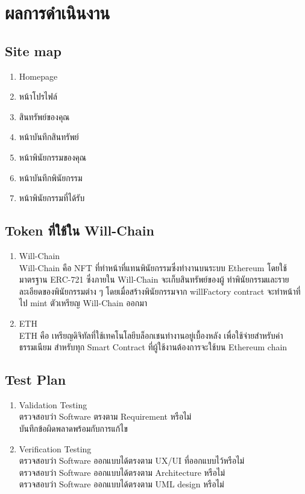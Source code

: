 \documentclass[12pt,oneside,openright,a4paper]{cpe-thai-project}
\begin{document}
\chapter{ผลการดําเนินงาน}
\section{Site map}
\begin{enumerate}[label=\thesection.\arabic*,leftmargin=0pt,itemindent=1.25cm]
	\item Homepage 
	\item หน้าโปรไฟล์ 
	\item สินทรัพย์ของคุณ 
	\item หน้าบันทึกสินทรัพย์
	\item หน้าพินัยกรรมของคุณ 
	\item หน้าบันทึกพินัยกรรม 
	\item หน้าพินัยกรรมที่ได้รับ 
\end{enumerate}
\section{Token ที่ใช้ใน Will-Chain}
\begin{enumerate}[label=\thesection.\arabic*,leftmargin=0pt,itemindent=1.25cm]
	\item Will-Chain \\
			\tab \tab Will-Chain คือ NFT ที่ทำหน้าที่แทนพินัยกรรมซึ่งทำงานบนระบบ Ethereum โดยใช้มาตรฐาน ERC-721 ซึ่งภายใน Will-Chain จะเก็บสินทรัพย์ของผู้
ทำพินัยกรรมและรายละเอียดของพินัยกรรมต่าง ๆ โดยเมื่อสร้างพินัยกรรมจาก willFactory contract จะทำหน้าที่ไป mint ตัวเหรียญ Will-Chain ออกมา
	\item ETH \\
			\tab \tab ETH คือ เหรียญดิจิทัลที่ใช้เทคโนโลยีบล็อกเชนทำงานอยู่เบื้องหลัง เพื่อใช้จ่ายสำหรับค่าธรรมเนียม สำหรับทุก Smart Contract ที่ผู้ใช้งานต้องการจะใช้บน Ethereum chain
	\end{enumerate}
\section{Test Plan}
\begin{enumerate}[label=\thesection.\arabic*,leftmargin=0pt,itemindent=1.25cm]
\item Validation Testing \\
\tab \tab ตรวจสอบว่า Software ตรงตาม Requirement หรือไม่\\
\tab \tab บันทึกข้อผิดพลาดพร้อมกับการแก้ไข
\item Verification Testing \\
\tab \tab ตรวจสอบว่า Software ออกแบบได้ตรงตาม UX/UI ที่ออกแบบไว้หรือไม่\\
\tab \tab ตรวจสอบว่า Software ออกแบบได้ตรงตาม Architecture หรือไม่\\
\tab \tab ตรวจสอบว่า Software ออกแบบได้ตรงตาม UML design หรือไม่\\
\end{enumerate}
\clearpage
\end{document}
